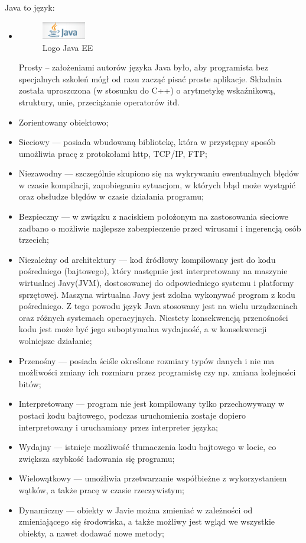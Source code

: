 \documentclass[eng,printmode,oneside]{mgr}
\begin{document}
Java to język:

\begin{itemize}
  \item  \parbox[t]{\dimexpr\textwidth-\leftmargin}{
      \vspace{-2.5mm}
    \begin{figure}
	\centering
	\includegraphics[width=0.18\textwidth]{javaEE.png}
	\caption{\label{fig:javaEE}Logo Java EE \cite{java.oracle.ee}}
	\end{figure}
  Prosty -- założeniami autorów języka Java było, aby programista bez
  specjalnych szkoleń mógł od razu zacząć pisać proste aplikacje. Składnia
  została uproszczona (w stosunku do C++) o arytmetykę wskaźnikową, struktury,
  unie, przeciążanie operatorów itd. 
	}
  \item Zorientowany obiektowo;
  \item Sieciowy --- posiada wbudowaną bibliotekę, która w przystępny sposób
  umożliwia pracę z protokołami http, TCP/IP, FTP;
  \item Niezawodny --- szczególnie skupiono się na wykrywaniu ewentualnych
  błędów w czasie kompilacji, zapobieganiu sytuacjom, w których błąd może
  wystąpić oraz obsłudze błędów w czasie działania programu;
  \item Bezpieczny --- w związku z naciskiem położonym na zastosowania sieciowe
  zadbano o możliwie najlepsze zabezpieczenie przed wirusami i ingerencją osób
  trzecich;
  \item Niezależny od architektury --- kod źródłowy kompilowany jest do kodu
  pośredniego (bajtowego), który następnie jest interpretowany na maszynie
  wirtualnej Javy(JVM), dostosowanej do odpowiedniego systemu i platformy sprzętowej. Maszyna
  wirtualna Javy jest zdolna wykonywać program z kodu pośredniego. Z tego powodu język Java
  stosowany jest na wielu urządzeniach oraz różnych systemach operacyjnych.
  Niestety konsekwencją przenośności kodu jest może być jego suboptymalna
  wydajność, a w konsekwencji wolniejsze działanie;
  \item Przenośny --- posiada ściśle określone rozmiary typów danych i nie ma
  możliwości zmiany ich rozmiaru przez programistę czy np.
  zmiana kolejności bitów;
  \item Interpretowany --- program nie jest kompilowany tylko przechowywany w
  postaci kodu bajtowego, podczas uruchomienia zostaje dopiero interpretowany i
  uruchamiany przez interpreter języka;
  \item Wydajny --- istnieje możliwość tłumaczenia kodu bajtowego w locie,
  co zwiększa szybkość ładowania się programu;
  \item Wielowątkowy --- umożliwia przetwarzanie współbieżne z wykorzystaniem
  wątków, a także pracę w czasie rzeczywistym;
  \item Dynamiczny --- obiekty w Javie można zmieniać w zależności od
  zmieniającego się środowiska, a także możliwy jest wgląd we wszystkie obiekty,
  a nawet dodawać nowe metody;
\end{itemize}
\end{document}
